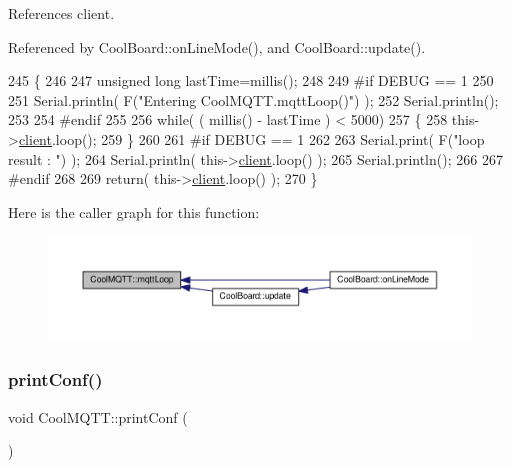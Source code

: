 References client.



Referenced by Cool\+Board\+::on\+Line\+Mode(), and Cool\+Board\+::update().


\begin{DoxyCode}
245 \{
246 
247     \textcolor{keywordtype}{unsigned} \textcolor{keywordtype}{long} lastTime=millis();
248 
249 \textcolor{preprocessor}{#if DEBUG == 1}
250 
251     Serial.println( F(\textcolor{stringliteral}{"Entering CoolMQTT.mqttLoop()"}) );
252     Serial.println();
253 
254 \textcolor{preprocessor}{#endif  }
255 
256     \textcolor{keywordflow}{while}( ( millis() - lastTime ) < 5000)
257     \{
258         this->\hyperlink{classCoolMQTT_a4ca71e4f76ef868692a297efd45b1415}{client}.loop();  
259     \}
260 
261 \textcolor{preprocessor}{#if DEBUG == 1 }
262     
263     Serial.print( F(\textcolor{stringliteral}{"loop result : "}) );
264     Serial.println( this->\hyperlink{classCoolMQTT_a4ca71e4f76ef868692a297efd45b1415}{client}.loop() );
265     Serial.println();
266 
267 \textcolor{preprocessor}{#endif}
268 
269     \textcolor{keywordflow}{return}( this->\hyperlink{classCoolMQTT_a4ca71e4f76ef868692a297efd45b1415}{client}.loop() );
270 \}
\end{DoxyCode}
Here is the caller graph for this function\+:
\nopagebreak
\begin{figure}[H]
\begin{center}
\leavevmode
\includegraphics[width=350pt]{classCoolMQTT_aa5eaae967b562b62cbcf2b8d81f6e5d5_icgraph}
\end{center}
\end{figure}
\mbox{\label{classCoolMQTT_a40553a0ad4b5ecf1cb4411ab54ca85fb}} 
\subsubsection{\texorpdfstring{print\+Conf()}{printConf()}}
{\footnotesize\ttfamily void Cool\+M\+Q\+T\+T\+::print\+Conf (\begin{DoxyParamCaption}{ }\end{DoxyParamCaption})}

